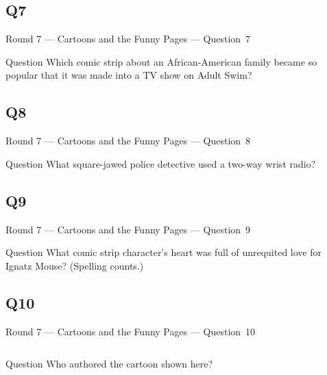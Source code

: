 \documentclass[11pt]{beamer}
\begin{document}
\subsection*{Q7}
\begin{frame}[t]{Round 7 --- Cartoons and the Funny Pages --- \mbox{Question 7}}
    \vspace{-0.5em}
    \begin{block}{Question}
        Which comic strip about an African-American family became so popular that it was made into a TV show on Adult Swim?
    \end{block}
\end{frame}
\subsection*{Q8}
\begin{frame}[t]{Round 7 --- Cartoons and the Funny Pages --- \mbox{Question 8}}
    \vspace{-0.5em}
    \begin{block}{Question}
        What square-jawed police detective used a two-way wrist radio?
    \end{block}
\end{frame}
\subsection*{Q9}
\begin{frame}[t]{Round 7 --- Cartoons and the Funny Pages --- \mbox{Question 9}}
    \vspace{-0.5em}
    \begin{block}{Question}
        What comic strip character's heart was full of unrequited love for Ignatz Mouse? (Spelling counts.)
    \end{block}
\end{frame}
\subsection*{Q10}
\begin{frame}[t]{Round 7 --- Cartoons and the Funny Pages --- \mbox{Question 10}}
    \vspace{-0.5em}
    \begin{columns}[T,totalwidth=\linewidth]
        \begin{column}{0.32\linewidth}
            \begin{block}{Question}
                Who authored the cartoon shown here?
            \end{block}
        \end{column}
        \begin{column}{0.65\linewidth}
            \begin{center}
                \texttt{[image: \{Images/HairCutReminder]}.jpg}
            \end{center}
        \end{column}
    \end{columns}
\end{frame}
\end{document}
